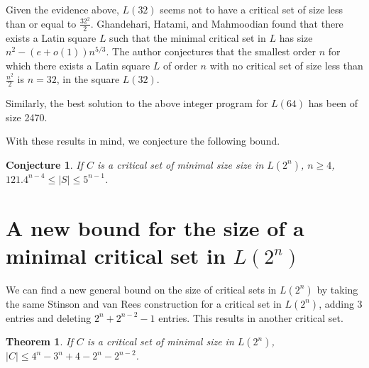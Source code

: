 \documentclass{article}
\newtheorem{theorem}{Theorem}
\newtheorem{conjecture}{Conjecture}
\begin{document}
Given the evidence above, $L(32)$ seems not to have a critical set
of size less than or equal to $\frac{32^2}{2}$.  Ghandehari,
Hatami, and Mahmoodian \cite{ghm} found that there exists a Latin
square $L$ such that the minimal critical set in $L$ has size
$n^2-(e+o(1))n^{5/3}$.  The author conjectures that the smallest
order $n$ for which there exists a Latin square $L$ of order $n$
with no critical set of size less than $\frac{n^2}{2}$ is $n=32$,
in the square $L(32)$.

Similarly, the best solution to the above integer program for
$L(64)$ has been of size 2470.

With these results in mind, we conjecture the following bound.

\begin{conjecture}
If $C$ is a critical set of minimal size size in $L(2^n)$, $n \geq
4$, $121.4^{n-4} \leq |S| \leq 5^{n-1}$.
\end{conjecture}

\section{A new bound for the size of a minimal critical set in $L(2^n)$}
We can find a new general bound on the size of critical sets in
$L(2^n)$ by taking the same Stinson and van Rees construction for
a critical set in $L(2^n)$, adding 3 entries and deleting
$2^n+2^{n-2}-1$ entries.  This results in another critical set.

\begin{theorem}
If $C$ is a critical set of minimal size in $L(2^n)$, $|C| \leq
4^n-3^n+4-2^n-2^{n-2}$.
\end{theorem}
\end{document}
